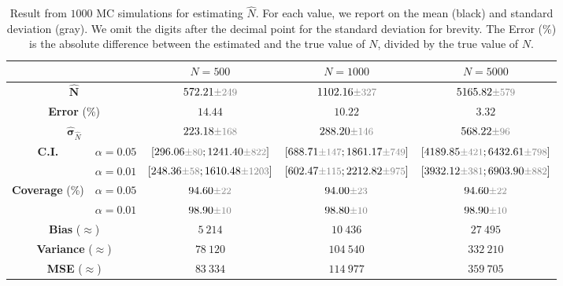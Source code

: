\begin{table}[h]
    \centering 
    \caption*{$p_i \sim 0.02 \cdot \mathrm{Beta}(1, 3)$}
    \begin{tabular}{c c|c c c}
        \toprule
        & & \multicolumn{1}{|c|}{${N}=500$} & \multicolumn{1}{c|}{${N}=1000$} & \multicolumn{1}{c}{${N}=5000$} \\
        \midrule
        \multicolumn{2}{c|}{${\hat{\mathbf{N}}}$} & $572.21 \variance{249}$ & $1102.16 \variance{327}$ & $5165.82 \variance{579}$  \\
        \multicolumn{2}{c|}{\textbf{Error} (\%)} & $14.44$ & $10.22$ & $3.32$ \\
        \multicolumn{2}{c|}{${\hat{\mathbf{\sigma}}}_{\hat{N}}$} & $223.18 \variance{168}$ & $288.20 \variance{146}$ & $568.22 \variance{96}$\\
        \multirow{2}{*}{\textbf{C.I.}} & $\alpha = 0.05$ & $[296.06 \variance{80}; 1241.40 \variance{822}]$ & $[688.71 \variance{147}; 1861.17 \variance{749}]$ & $[4189.85 \variance{421}; 6432.61 \variance{798}]$
        \\
        & $\alpha = 0.01$ & $[248.36 \variance{58}; 1610.48 \variance{1203}]$ & $[602.47 \variance{115}; 2212.82 \variance{975}]$ & $[3932.12 \variance{381}; 6903.90 \variance{882}]$ \\
        \midrule
        \multirow{2}{*}{\textbf{Coverage} (\%)} & $\alpha = 0.05$ & $94.60 \variance{22}$ & $94.00 \variance{23}$ & $94.60 \variance{22}$ \\
        & $\alpha = 0.01$ & $98.90 \variance{10}$ & $98.80 \variance{10}$ & $98.90 \variance{10}$ \\
        \multicolumn{2}{c|}{\textbf{Bias} ($\approx$)} & $5\ 214$ & $10\ 436$ & $27\ 495$ \\
        \multicolumn{2}{c|}{\textbf{Variance} ($\approx$)} & $78\ 120$ & $104\ 540$ & $332\ 210$ \\
        \multicolumn{2}{c|}{\textbf{MSE} ($\approx$)} & $83\ 334$ & $114\ 977$ & $359\ 705$ \\
        \bottomrule
    \end{tabular}
    \caption{Result from $1000$ MC simulations for estimating $\hat{N}$. For each value, we report on the mean (black) and standard deviation (gray). We omit the digits after the decimal point for the standard deviation for brevity.
    The Error (\%) is the absolute difference between the estimated and the true value of $N$, divided by the true value of $N$.}
    \label{tab:problem_2_results_beta_1_3}
\end{table}

